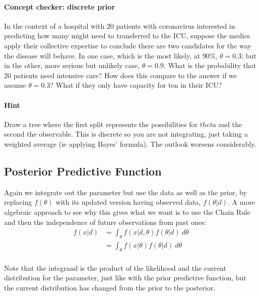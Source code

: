\documentclass{article}
\begin{document}
\begin{Exercise}
    \paragraph{Concept checker: discrete prior} In the context of a hospital with $20$ patients with coronavirus interested in predicting how many might need to transferred to the ICU, suppose the medics apply their collective expertise to conclude there are two candidates for the way the disease will behave. In one case, which is the most likely, at $90\%$, $\theta=0.3$; but in the other, more serious but unlikely case, $\theta=0.9$. What is the probability that $20$ patients need intensive care? How does this compare to the answer if we assume $\theta=0.3$? What if they only have capacity for ten in their ICU?
    
    \paragraph{Hint} Draw a tree where the first split represents the possibilities for $theta$ and the second the observable. This is discrete so you are not integrating, just taking a weighted average (ie applying Bayes' formula). The outlook worsens considerably.
\end{Exercise}

\subsection{Posterior Predictive Function}
Again we integrate out the parameter but use the data as well as the prior, by replacing $f(\theta)$ with its updated version having observed data, $f(\theta|d)$. A more algebraic approach to see why this gives what we want is to use the Chain Rule and then the independence of future observations from past ones:
\begin{equation}
\begin{split}
        f(x|d) 
        &= \int_\theta f(x|d,\theta)f(\theta|d)\ d\theta \\
        &= \int_\theta f(x|\theta)f(\theta|d)\ d\theta \\
\end{split}
\end{equation}

Note that the integrand is the product of the likelihood and the current distribution for the parameter, just like with the prior predictive function, but the current distribution has changed from the prior to the posterior.
\end{document}
